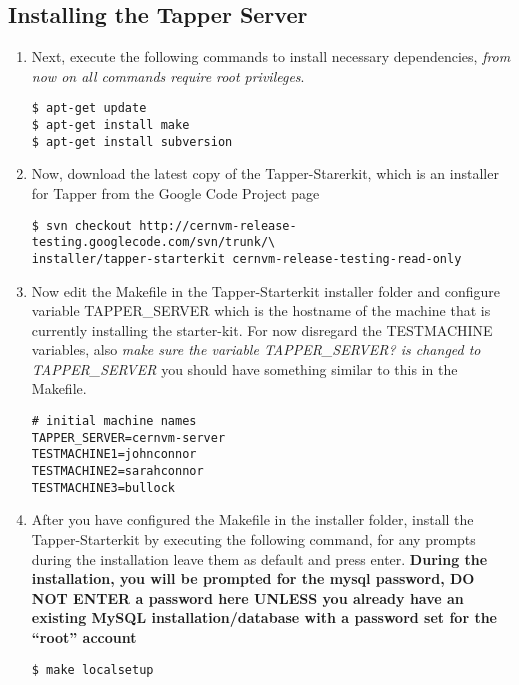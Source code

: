 \subsection{Installing the Tapper Server}
\begin{enumerate}
\item Next, execute the following commands to install necessary dependencies, \emph{from now on all commands require root privileges}.
\lstset{caption= Install Dependencies}
\begin{lstlisting}
$ apt-get update
$ apt-get install make
$ apt-get install subversion
\end{lstlisting}

\item Now, download the latest copy of the Tapper-Starerkit, which is an installer for Tapper from the \cernvmreleasetesting 
Google Code Project page
\lstset{caption= Download Tapper-Starterkit}
\begin{lstlisting}
$ svn checkout http://cernvm-release-testing.googlecode.com/svn/trunk/\
installer/tapper-starterkit cernvm-release-testing-read-only
\end{lstlisting}

\item Now edit the Makefile in the Tapper-Starterkit installer folder and configure variable TAPPER\_SERVER which 
is the hostname of the machine that is currently installing the starter-kit. For now disregard the TESTMACHINE 
variables, also \emph{make sure the variable TAPPER\_SERVER? is changed to TAPPER\_SERVER} you should have something
similar to this in the Makefile.
\lstset{caption= Makefile Configuration}
\begin{lstlisting}
# initial machine names
TAPPER_SERVER=cernvm-server
TESTMACHINE1=johnconnor
TESTMACHINE2=sarahconnor
TESTMACHINE3=bullock
\end{lstlisting}

\item After you have configured the Makefile in the installer folder, install the Tapper-Starterkit by executing the
following command, for any prompts during the installation leave them as default and press enter. {\bf During
the installation, you will be prompted for the mysql password, DO NOT ENTER a password here UNLESS you already have an
existing MySQL installation/database with a password set for the ``root'' account}
\lstset{caption= Install Tapper-Starterkit}
\begin{lstlisting}
$ make localsetup
\end{lstlisting}
\end{enumerate}

